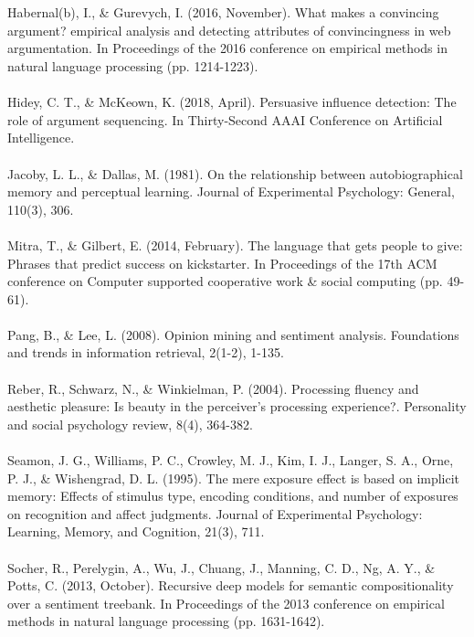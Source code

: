 \documentclass[11pt,a4paper]{article}
\begin{document}
\\\\
Habernal(b), I., \& Gurevych, I. (2016, November). What makes a convincing argument? empirical analysis and detecting attributes of convincingness in web argumentation. In Proceedings of the 2016 conference on empirical methods in natural language processing (pp. 1214-1223).
\\\\
Hidey, C. T., \& McKeown, K. (2018, April). Persuasive influence detection: The role of argument sequencing. In Thirty-Second AAAI Conference on Artificial Intelligence.
\\\\
Jacoby, L. L., \& Dallas, M. (1981). On the relationship between autobiographical memory and perceptual learning. Journal of Experimental Psychology: General, 110(3), 306.
\\\\
Mitra, T., \& Gilbert, E. (2014, February). The language that gets people to give: Phrases that predict success on kickstarter. In Proceedings of the 17th ACM conference on Computer supported cooperative work \& social computing (pp. 49-61).
\\\\
Pang, B., \& Lee, L. (2008). Opinion mining and sentiment analysis. Foundations and trends in information retrieval, 2(1-2), 1-135.
\\\\
Reber, R., Schwarz, N., \& Winkielman, P. (2004). Processing fluency and aesthetic pleasure: Is beauty in the perceiver's processing experience?. Personality and social psychology review, 8(4), 364-382.
\\\\
Seamon, J. G., Williams, P. C., Crowley, M. J., Kim, I. J., Langer, S. A., Orne, P. J., \& Wishengrad, D. L. (1995). The mere exposure effect is based on implicit memory: Effects of stimulus type, encoding conditions, and number of exposures on recognition and affect judgments. Journal of Experimental Psychology: Learning, Memory, and Cognition, 21(3), 711.
\\\\
Socher, R., Perelygin, A., Wu, J., Chuang, J., Manning, C. D., Ng, A. Y., \& Potts, C. (2013, October). Recursive deep models for semantic compositionality over a sentiment treebank. In Proceedings of the 2013 conference on empirical methods in natural language processing (pp. 1631-1642).
\\\\
\end{document}
